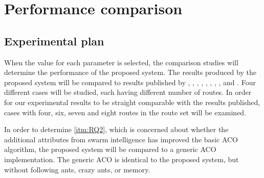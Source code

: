 \section{Performance comparison}
\label{sec:performanceComparison}
\subsection{Experimental plan}
When the value for each parameter is selected, the comparison studies will determine the performance of the proposed system. The results produced by the proposed system will be compared to results published by \citet{mandl79}, \citet{kechagiopoulos14}, \citet{nikolic14}, \citet{kidwai98}, \citet{fan10}, \citet{chakroborty02}, \citet{zhang10}, \citet{chew12}, and \citet{baaj91}. Four different cases will be studied, each having different number of routes. In order for our experimental results to be straight comparable with the results published, cases with four, six, seven and eight routes in the route set will be examined.

In order to determine \vref{itm:RQ2}, which is concerned about whether the additional attributes from swarm intelligence has improved the basic ACO algorithm, the proposed system will be compared to a generic ACO implementation. The generic ACO is identical to the proposed system, but without following ants, crazy ants, or memory. 

